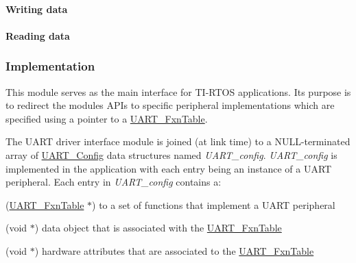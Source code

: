 \paragraph*{Writing data}




\paragraph*{Reading data}




\subsubsection*{Implementation}

This module serves as the main interface for T\+I-\/\+R\+T\+O\+S applications. Its purpose is to redirect the module\textquotesingle{}s A\+P\+Is to specific peripheral implementations which are specified using a pointer to a \hyperlink{struct_u_a_r_t___fxn_table}{U\+A\+R\+T\+\_\+\+Fxn\+Table}.

The U\+A\+R\+T driver interface module is joined (at link time) to a N\+U\+L\+L-\/terminated array of \hyperlink{struct_u_a_r_t___config}{U\+A\+R\+T\+\_\+\+Config} data structures named {\itshape U\+A\+R\+T\+\_\+config}. {\itshape U\+A\+R\+T\+\_\+config} is implemented in the application with each entry being an instance of a U\+A\+R\+T peripheral. Each entry in {\itshape U\+A\+R\+T\+\_\+config} contains a\+:
\begin{DoxyItemize}
\item (\hyperlink{struct_u_a_r_t___fxn_table}{U\+A\+R\+T\+\_\+\+Fxn\+Table} $\ast$) to a set of functions that implement a U\+A\+R\+T peripheral
\item (void $\ast$) data object that is associated with the \hyperlink{struct_u_a_r_t___fxn_table}{U\+A\+R\+T\+\_\+\+Fxn\+Table}
\item (void $\ast$) hardware attributes that are associated to the \hyperlink{struct_u_a_r_t___fxn_table}{U\+A\+R\+T\+\_\+\+Fxn\+Table}
\end{DoxyItemize}


